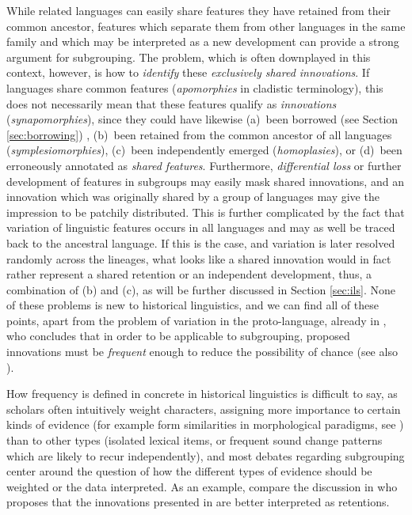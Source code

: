 \documentclass[svgnames,12pt]{scrartcl}
\begin{document}
{While related languages can easily share features they have retained from their common ancestor,
features which separate them from other languages in the same family and which may be interpreted as
a
new development can provide a strong argument for subgrouping. The problem, which is often
downplayed in this context, however, is how to \emph{identify} these \emph{exclusively shared
innovations}. If languages share common features (\emph{apomorphies} in cladistic terminology),
this does not necessarily mean that these features qualify as \emph{innovations}
(\emph{synapomorphies}), since they could have likewise (a)~been borrowed (see Section
\ref{sec:borrowing}) , (b)~been retained from the
common ancestor of all languages (\emph{symplesiomorphies}), (c)~been independently emerged
(\emph{homoplasies}), or (d)~been erroneously annotated as \emph{shared features}. Furthermore,
\emph{differential loss} or further development of features in subgroups may easily mask shared
innovations, and an innovation which was originally shared by a group of languages may give the
impression to be patchily distributed. This is further complicated by the fact that variation of
linguistic features occurs in all languages and may as well be traced back to the ancestral
language. If this is the case, and variation is later resolved randomly across the lineages, what
looks like a shared innovation would in fact rather represent a shared retention or an independent
development, thus, a combination of (b) and (c), as will be further discussed in Section
\ref{sec:ils}. None of these problems is new to historical linguistics, and we can find all of these
points, apart from the problem of variation in the proto-language, already in \citet{Brugmann1884},
who concludes that in order to be
applicable to subgrouping, proposed innovations must be \emph{frequent} enough to reduce the
possibility of chance (see also \citealt{Dyen1953}). 
 
How frequency is defined in concrete in historical linguistics is difficult to say, as scholars
often intuitively weight characters, assigning more importance to certain kinds of evidence (for
example form similarities in morphological paradigms, see \citealt{Nichols1996}) than to other types
(isolated lexical items, or frequent sound change patterns which are likely to recur independently),
and most debates regarding subgrouping center around the question of how the different types of
evidence should be weighted or the data interpreted. As an example, compare the discussion in
\citet{Sagart2015} who proposes that the innovations presented in \citet{Blust1999} are better
interpreted as retentions.
 
}
\end{document}
